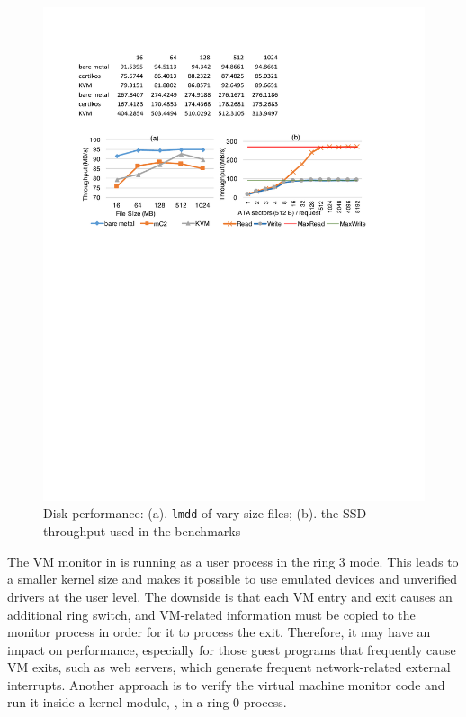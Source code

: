 \begin{figure}\centering
		\includegraphics[width=14cm]{figs/disk.pdf}
		\caption{Disk performance: (a). \texttt{lmdd} of vary size files; (b). the SSD throughput used in the benchmarks}
		\label{fig:eval_disk}
		\hrulefill
\end{figure}


The VM monitor in \mCTOShyper{} is running as a user
process in the ring 3 mode. This leads to a smaller kernel
size and makes it possible to use emulated devices and unverified
drivers at the user level.  The downside is that each
VM entry and exit causes an additional ring switch, and VM-related
information must be copied to the monitor process in order for it to
process the exit. Therefore, it may have an impact on performance,
especially for those guest programs that frequently cause VM exits,
such as web servers, which generate frequent network-related external
interrupts.  Another approach is to verify the virtual machine monitor
code and run it inside a kernel module, \eg, in a ring 0 process.




